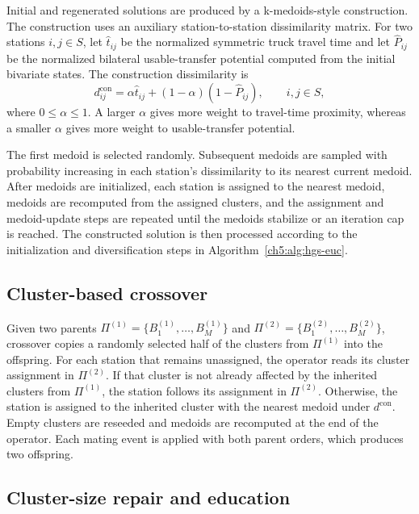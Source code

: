 Initial and regenerated solutions are produced by a k-medoids-style construction.
The construction uses an auxiliary station-to-station dissimilarity matrix. For
two stations $i,j\in S$, let $\hat t_{ij}$ be the normalized symmetric truck
travel time and let $\hat P_{ij}$ be the normalized bilateral usable-transfer
potential computed from the initial bivariate states. The construction
dissimilarity is
\begin{equation}
d_{ij}^{\mathrm{con}}
=\alpha \hat t_{ij}+(1-\alpha)(1-\hat P_{ij}),
\qquad i,j\in S,
\label{ch5:eq:construction-dissimilarity}
\end{equation}
where $0\le \alpha\le 1$. A larger $\alpha$ gives more weight to travel-time
proximity, whereas a smaller $\alpha$ gives more weight to usable-transfer
potential.

The first medoid is selected randomly. Subsequent medoids are sampled with
probability increasing in each station's dissimilarity to its nearest current
medoid. After medoids are initialized, each station is assigned to the nearest
medoid, medoids are recomputed from the assigned clusters, and the assignment and
medoid-update steps are repeated until the medoids stabilize or an iteration cap
is reached. The constructed solution is then processed according to the
initialization and diversification steps in Algorithm~\ref{ch5:alg:hgs-euc}.

\subsection{Cluster-based crossover}\label{ch5:sec:hgs-euc-crossover}

Given two parents $\Pi^{(1)}=\{B_1^{(1)},\ldots,B_M^{(1)}\}$ and
$\Pi^{(2)}=\{B_1^{(2)},\ldots,B_M^{(2)}\}$, crossover copies a randomly selected
half of the clusters from $\Pi^{(1)}$ into the offspring. For each station that
remains unassigned, the operator reads its cluster assignment in $\Pi^{(2)}$. If
that cluster is not already affected by the inherited clusters from
$\Pi^{(1)}$, the station follows its assignment in $\Pi^{(2)}$. Otherwise, the
station is assigned to the inherited cluster with the nearest medoid under
$d^{\mathrm{con}}$. Empty clusters are reseeded and medoids are recomputed at the
end of the operator. Each mating event is applied with both parent orders, which
produces two offspring.

\subsection{Cluster-size repair and education}\label{ch5:sec:hgs-euc-repair-education}

